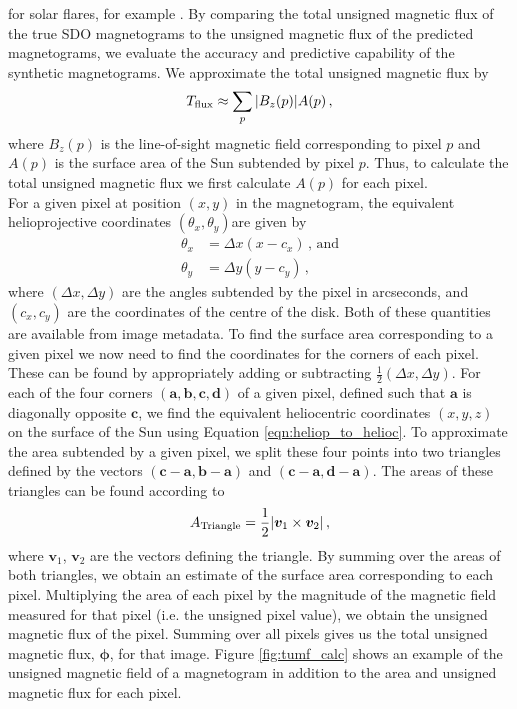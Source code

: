 \documentclass[11pt,a4paper,onecolumn]{report}
\DeclarePairedDelimiter{\abs}{\lvert}{\rvert}
\begin{document}
for solar flares, for example
\citet{song_statistical_2009,yuan_solar_2010,lan_automated_2012,chen_identifying_2019}.
By comparing the total unsigned magnetic flux of the true SDO magnetograms to
the unsigned magnetic flux of the predicted magnetograms, we evaluate the
accuracy and predictive capability of the synthetic magnetograms. We approximate
the total unsigned magnetic flux by 
\begin{align}
  T_{\text{flux}} \approx \sum\limits_p \absolutevalue{B_z(p)} A(p) \, ,
\end{align}
where $B_z(p)$ is the line-of-sight magnetic field corresponding to pixel $p$
and $A(p)$ is the surface area of the Sun subtended by pixel $p$. Thus, to
calculate the total unsigned magnetic flux we first calculate $A(p)$ for each
pixel.\\

For a given pixel at position \( (x, y) \) in the magnetogram, the equivalent
helioprojective coordinates \((\theta_x, \theta_y)\)are given by
\begin{align}
  \theta_x &= \Delta x (x - c_x) \, \text{, and} \\
  \theta_y &= \Delta y (y - c_y) \, ,
\end{align}
where  \((\Delta x, \Delta y)\) are the angles subtended by the pixel in
arcseconds, and \( (c_x, c_y) \) are the coordinates of the centre of the disk.
Both of these quantities are available from image metadata. To find the surface
area corresponding to a given pixel we now need to find the coordinates for the
corners of each pixel. These can be found by appropriately adding or subtracting
\(\frac{1}{2} (\Delta x, \Delta y)\). For each of the four corners \((\bm{a},
\bm{b}, \bm{c}, \bm{d})\) of a given pixel, defined such that $\bm{a}$ is
diagonally opposite $\bm{c}$, we find the equivalent heliocentric coordinates
\((x, y, z)\) on the surface of the Sun using Equation
\ref{eqn:heliop_to_helioc}. To approximate the area subtended by a given pixel,
we split these four points into two triangles defined by the vectors
\((\bm{c}-\bm{a}, \bm{b} - \bm{a}) \) and \((\bm{c}-\bm{a}, \bm{d} - \bm{a}) \).
The areas of these triangles can be found according to
\begin{align}
  A_{\text{Triangle}} = \frac{1}{2} \abs*{\bm{v}_1 \times \bm{v}_2} \, ,
\end{align}
where \(\bm{v}_1\), \(\bm{v}_2\) are the vectors defining the triangle. By
summing over the areas of both triangles, we obtain an estimate of the surface
area corresponding to each pixel. Multiplying the area of each pixel by the
magnitude of the magnetic field measured for that pixel (i.e. the unsigned pixel
value), we obtain the unsigned magnetic flux of the pixel. Summing over all
pixels gives us the total unsigned magnetic flux, \(\bm{\phi}\), for that image.
Figure \ref{fig:tumf_calc} shows an example of the unsigned magnetic field of a
magnetogram in addition to the area and unsigned magnetic flux for each pixel.
\\
\end{document}
